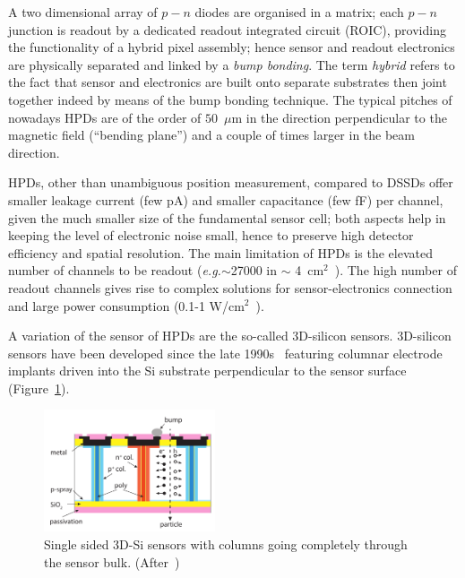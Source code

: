 A two dimensional array of $p-n$ diodes are organised in a matrix; each $p-n$ junction is readout 
by a dedicated  readout integrated circuit (ROIC), providing the functionality of a hybrid pixel assembly; 
hence sensor and readout electronics are physically separated 
and linked by a {\it bump bonding}. The term {\it hybrid} refers to the fact that sensor and electronics 
are built onto separate substrates then joint together indeed by means of the bump bonding technique.
The typical pitches of nowadays HPDs are of the order of 
 $50$~$\mu$m in the direction perpendicular to the magnetic field (``bending plane'') and 
 a couple of times larger in the beam direction.
 

 
 HPDs, other than unambiguous position measurement, compared to DSSDs offer 
 smaller leakage current (few pA) and smaller capacitance (few fF) per channel, 
 given the much smaller size of the 
 fundamental sensor cell; both aspects help in keeping the level of electronic noise small, hence 
 to preserve high detector efficiency and spatial resolution.
 The main limitation of HPDs is the elevated number of channels to be readout ({\it e.g.}$\sim$27000 
 in $\sim$ 4~cm$^2$~\cite{IBLTDR}). 
 The high number 
 of readout channels gives rise to complex solutions for sensor-electronics connection and 
 large power consumption (0.1-1 W/cm$^2$~\cite{IBLTDR}).

A variation of the sensor of HPDs are the so-called 3D-silicon sensors. 3D-silicon sensors have been 
developed since the late 1990s~\cite{PARKER1997328} 
featuring columnar electrode implants driven into the Si substrate perpendicular to the sensor surface 
(Figure~\ref{fig:tredi}).

 \begin{figure}[htbp]
   \centering
  \includegraphics[width=0.45\textwidth]{tredi.pdf} 
      \caption{\label{fig:tredi}Single sided 3D-Si sensors with columns going completely through the 
      sensor bulk. (After~\cite{Garcia-Sciveres:2017ymt})}
\end{figure}

